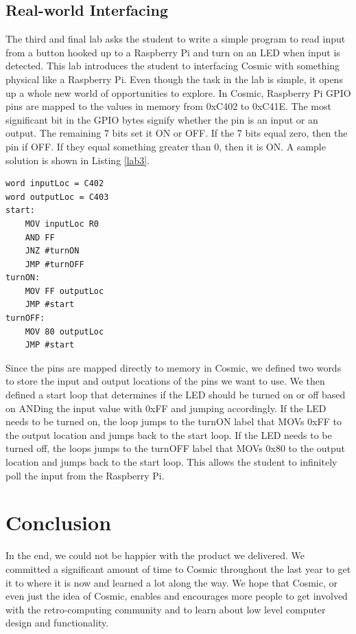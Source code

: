 \documentclass[conference]{IEEEtran}
\begin{document}
\subsection{Real-world Interfacing}
The third and final lab asks the student to write a simple program to read input from a button hooked up to a Raspberry Pi and turn on an LED when input is detected. This lab introduces the student to interfacing Cosmic with something physical like a Raspberry Pi. Even though the task in the lab is simple, it opens up a whole new world of opportunities to explore. In Cosmic, Raspberry Pi GPIO pins are mapped to the values in memory from 0xC402 to 0xC41E. The most significant bit in the GPIO bytes signify whether the pin is an input or an output. The remaining 7 bits set it ON or OFF. If the 7 bits equal zero, then the pin if OFF. If they equal something greater than 0, then it is ON. A sample solution is shown in Listing \ref{lab3}.

\begin{lstlisting}[caption={Cosmic assembly to interface with a Raspberry Pi.}, label = {lab3}]
word inputLoc = C402
word outputLoc = C403
start:
	MOV inputLoc R0
    AND FF
	JNZ #turnON
    JMP #turnOFF
turnON:
	MOV FF outputLoc
    JMP #start
turnOFF:
	MOV 80 outputLoc
	JMP #start
\end{lstlisting}

Since the pins are mapped directly to memory in Cosmic, we defined two words to store the input and output locations of the pins we want to use. We then defined a start loop that determines if the LED should be turned on or off based on ANDing the input value with 0xFF and jumping accordingly. If the LED needs to be turned on, the loop jumps to the turnON label that MOVs 0xFF to the output location and jumps back to the start loop. If the LED needs to be turned off, the loops jumps to the turnOFF label that MOVs 0x80 to the output location and jumps back to the start loop. This allows the student to infinitely poll the input from the Raspberry Pi.


\section{Conclusion}
In the end, we could not be happier with the product we delivered. We committed a significant amount of time to Cosmic throughout the last year to get it to where it is now and learned a lot along the way. We hope that Cosmic, or even just the idea of Cosmic, enables and encourages more people to get involved with the retro-computing community and to learn about low level computer design and functionality.
\end{document}
